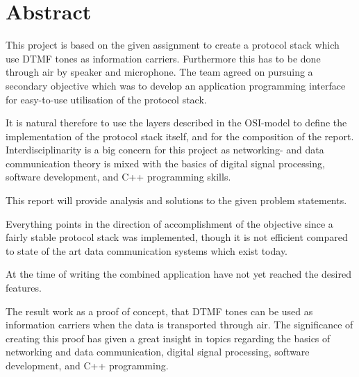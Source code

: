 \chapter*{Abstract}
This project is based on the given assignment to create a protocol stack which
use DTMF tones as information carriers. Furthermore this has to be done through air
by speaker and microphone. The team agreed on pursuing a secondary objective which
was to develop an application programming interface for easy-to-use utilisation of
the protocol stack.

It is natural therefore to use the layers described in the OSI-model to define
the implementation of the protocol stack itself, and for the composition of the report.
Interdisciplinarity is a big concern for this project as networking- and data communication
theory is mixed with the basics of digital signal processing, software development,
and C++ programming skills. 

This report will provide analysis and solutions to the given problem statements.


Everything points in the direction of accomplishment of the objective since a fairly stable 
protocol stack was implemented, though it is not efficient compared to state of the art
data communication systems which exist today. 

At the time of writing the combined application have not yet reached the desired features.

The result work as a proof of concept, that DTMF tones can be used as information carriers
when the data is transported through air. The significance of creating this proof has given a
great insight in topics regarding the basics of networking and data communication,
digital signal processing, software development, and C++ programming.